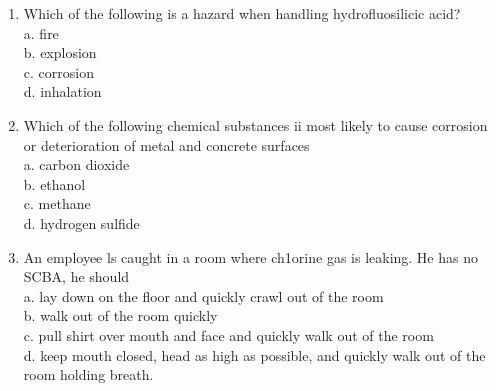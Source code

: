 \documentclass{article}
\begin{document}
\begin{enumerate}
\item Which of the following is a hazard when handling hydrofluosilicic acid?\\
a.	fire\\
b.	explosion\\
c.	corrosion\\
d.	inhalation\\

\item Which of the following chemical substances ii most likely to cause corrosion or deterioration of metal and concrete surfaces\\
a.	carbon dioxide\\
b.	ethanol\\
c.	methane\\
d.	hydrogen sulfide\\


\item An employee ls caught in a room where ch1orine gas is leaking.  He has no SCBA, he should\\
a.	lay down on the floor and quickly crawl out of the room \\
b.	walk out of the room quickly\\
c.	pull shirt over mouth and face and quickly walk out of the room\\
d.	keep mouth closed, head as high as possible, and quickly walk out of the room holding breath.\\



\end{enumerate}
\end{document}
